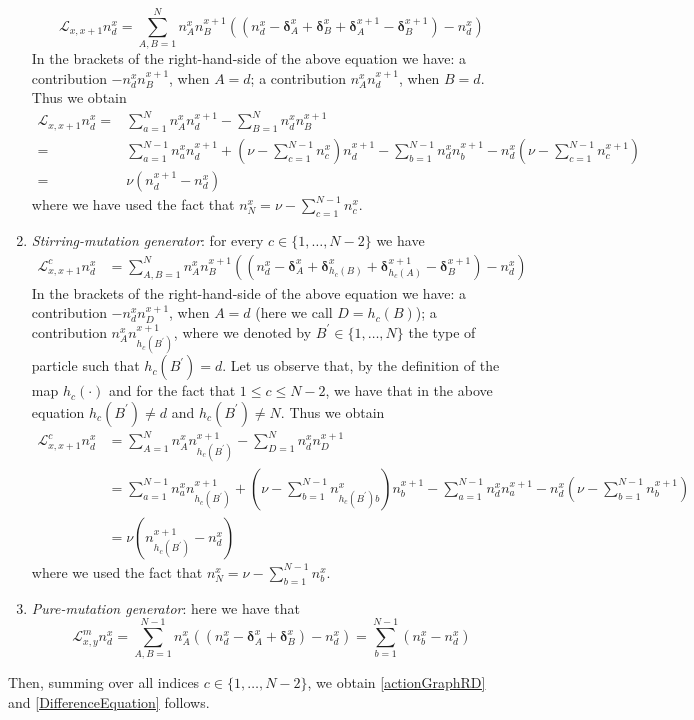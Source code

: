 \documentclass[10pt]{article}
\numberwithin{equation}{section}
\numberwithin{equation}{subsection}
\begin{document}
\begin{enumerate}
\begin{equation}
	\mathcal{L}_{x,x+1}n_{d}^{x}=\sum_{A,B=1}^{N}n_{A}^{x}n_{B}^{x+1}\left((n_{d}^{x}-\bm{\delta}_{A}^{x}+\bm{\delta}_{B}^{x}+\bm{\delta}_{A}^{x+1}-\bm{\delta}_{B}^{x+1})-n_{d}^{x}\right)
\end{equation}
In the brackets of the right-hand-side of the above equation we have: a contribution $-n_{d}^{x}n_{B}^{x+1}$, when $A=d$; a contribution $n_{A}^{x}n_{d}^{x+1}$, when $B=d$. Thus we obtain 
\begin{align*}
	\mathcal{L}_{x,x+1}n_{d}^{x}=&\sum_{a=1}^{N}n_{A}^{x}n_{d}^{x+1}-\sum_{B=1}^{N}n_{d}^{x}n_{B}^{x+1}\\
	=&\sum_{a=1}^{N-1}n_{a}^{x}n_{d}^{x+1}+(\nu-\sum_{c=1}^{N-1}n_{c}^{x})n_{d}^{x+1}-\sum_{b=1}^{N-1}n_{d}^{x}n_{b}^{x+1}-n_{d}^{x}(\nu-\sum_{c=1}^{N-1}n_{c}^{x+1})\\
	=&\nu\left(n_{d}^{x+1}-n_{d}^{x}\right)
\end{align*} 
where we have used the fact that $n_{N}^{x}=\nu-\sum_{c=1}^{N-1}n_{c}^{x}$.
\item \textit{Stirring-mutation generator}: for every $c\in \{1,\ldots,N-2\}$ we have 
\begin{equation}
	\begin{split}
		\mathcal{L}_{x,x+1}^{c}n_{d}^{x}&=\sum_{A,B=1}^{N}n_{A}^{x}n_{B}^{x+1}\left((n_{d}^{x}-\bm{\delta}_{A}^{x}+\bm{\delta}_{h_{c}(B)}^{x}+\bm{\delta}_{h_{c}(A)}^{x+1}-\bm{\delta}_{B}^{x+1})-n_{d}^{x}\right)
	\end{split}
\end{equation}
In the brackets of the right-hand-side of the above equation we have: a contribution $-n_{d}^{x}n_{D}^{x+1}$, when $A=d$ (here we call $D=h_{c}(B)$); a contribution $n_{A}^{x}n_{h_{c}(B^{'})}^{x+1}$, where we denoted by $B^{'}\in \{1,\ldots,N\}$ the type of particle such that $h_{c}(B^{'})=d$. Let us observe that, by the definition of the map $h_{c}(\cdot)$ and for the fact that $1\leq c\leq N-2$, we have that in the above equation $h_{c}(B^{'})\neq d$ and $h_{c}(B^{'})\neq N$. Thus we obtain 
\begin{align}
		\mathcal{L}_{x,x+1}^{c}n_{d}^{x}&=\sum_{A=1}^{N}n_{A}^{x}n_{h_{c}(B^{'})}^{x+1}-\sum_{D=1}^{N}n_{d}^{x}n_{D}^{x+1}
		\\&=
		\sum_{a=1}^{N-1}n_{a}^{x}n_{h_{c}(B^{'})}^{x+1}+\left(\nu-\sum_{b=1}^{N-1}n_{h_{c}(B^{'})b}^{x}\right)n_{b}^{x+1}-\sum_{a=1}^{N-1}n_{d}^{x}n_{a}^{x+1}-n_{d}^{x}\left(\nu-\sum_{b=1}^{N-1}n_{b}^{x+1}\right)
		\\&=
		\nu(n_{h_{c}(B^{'})}^{x+1}-n_{d}^{x})
\end{align}
where  we used the fact that $n_{N}^{x}=\nu-\sum_{b=1}^{N-1}n_{b}^{x}$. 
\item \textit{Pure-mutation generator}: here we have that 
\begin{equation}
	\mathcal{L}_{x,y}^{m}n_{d}^{x}=\sum_{A,B=1}^{N-1}n_{A}^{x}\left((n_{d}^{x}-\bm{\delta}_{A}^{x}+\bm{\delta}_{B}^{x})-n_{d}^{x}\right)=\sum_{b=1}^{N-1}(n_{b}^{x}-n_{d}^{x})
\end{equation}
\end{enumerate}
Then, summing over all indices $c\in\{1,\ldots,N-2\}$, we obtain \eqref{actionGraphRD} and \eqref{DifferenceEquation} follows.
\end{document}
